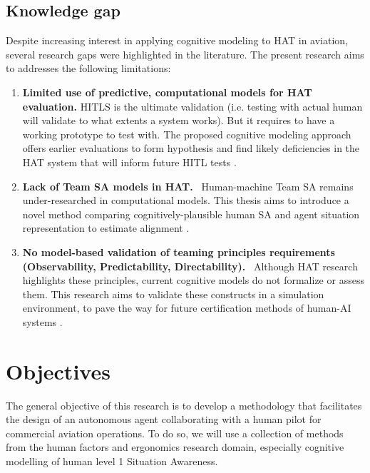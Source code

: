 \documentclass[12pt,a4paper]{article} %
\begin{document}
	\subsection{Knowledge gap}
	Despite increasing interest in applying cognitive modeling to HAT in aviation, several research gaps were highlighted in the literature. The present research aims to addresses the following limitations:

	\begin{enumerate}
		\item \textbf{Limited use of predictive, computational models for HAT evaluation.} 
		HITLS is the ultimate validation (i.e. testing with actual human will validate to what extents a system works). But it requires to have a working prototype to test with. The proposed cognitive modeling approach offers earlier evaluations to form hypothesis and find likely deficiencies in the HAT system that will inform future HITL tests \parencite{kaber_conceptual_2018,national_academies_of_sciences_engineering_and_medicine_human-ai_2022}.

		\item \textbf{Lack of Team SA models in HAT.} \
		Human-machine Team SA remains under-researched in computational models. This thesis aims to introduce a novel method comparing cognitively-plausible human SA and agent situation representation to estimate alignment \parencite{cooke_teams_2024,freiman_assessing_2019}.

		\item \textbf{No model-based validation of teaming principles requirements (Observability, Predictability, Directability).} \
		Although HAT research highlights these principles, current cognitive models do not formalize or assess them. This research aims to validate these constructs in a simulation environment, to pave the way for future certification methods of human-AI systems \parencite{johnson_coactive_2014,stensrud_exploring_2024}.
	\end{enumerate}

	\section{Objectives} %
	The general objective of this research is to develop a methodology that facilitates the design of an autonomous agent collaborating with a human pilot for commercial aviation operations. To do so, we will use a collection of methods from the human factors and ergonomics research domain, especially cognitive modelling of human level 1 Situation Awareness.
\end{document}
